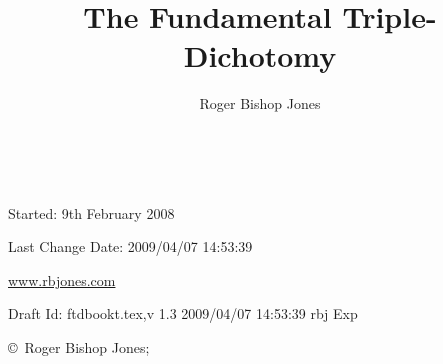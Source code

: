 \documentclass[10pt,titlepage,openany]{article}
\author{Roger Bishop Jones}
\title{The Fundamental Triple-Dichotomy}
\date{\ }
\begin{document}
\begin{titlepage}
\maketitle


\begin{centering}

{\footnotesize

Started: 9th February 2008

Last Change $ $Date: 2009/04/07 14:53:39 $ $

\href{http://www.rbjones.com/}{www.rbjones.com}

Draft $ $Id: ftdbookt.tex,v 1.3 2009/04/07 14:53:39 rbj Exp $ $

\copyright\ Roger Bishop Jones;

}%

\end{centering}

\thispagestyle{empty}
\end{titlepage}

{\parskip=0pt\tableofcontents}
\end{document}
